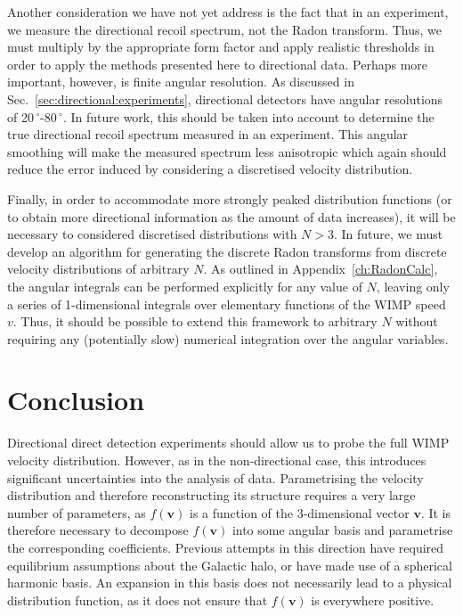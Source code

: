 Another consideration we have not yet address is the fact that in an experiment, we measure the directional recoil spectrum, not the Radon transform. Thus, we must multiply by the appropriate form factor and apply realistic thresholds in order to apply the methods presented here to directional data. Perhaps more important, however, is finite angular resolution. As discussed in Sec.~\ref{sec:directional:experiments}, directional detectors have angular resolutions of 20$\,^{\circ}$-80$\,^{\circ}$. In future work, this should be taken into account to determine the true directional recoil spectrum measured in an experiment. This angular smoothing will make the measured spectrum less anisotropic which again should reduce the error induced by considering a discretised velocity distribution.

Finally, in order to accommodate more strongly peaked distribution functions (or to obtain more directional information as the amount of data increases), it will be necessary to considered discretised distributions with $N > 3$. In future, we must develop an algorithm for generating the discrete Radon transforms from discrete velocity distributions of arbitrary $N$. As outlined in Appendix~\ref{ch:RadonCalc}, the angular integrals can be performed explicitly for any value of $N$, leaving only a series of 1-dimensional integrals over elementary functions of the WIMP speed $v$. Thus, it should be possible to extend this framework to arbitrary $N$ without requiring any (potentially slow) numerical integration over the angular variables.

\section{Conclusion}

Directional direct detection experiments should allow us to probe the full WIMP velocity distribution. However, as in the non-directional case, this introduces significant uncertainties into the analysis of data. Parametrising the velocity distribution and therefore reconstructing its structure requires a very large number of parameters, as $f(\mathbf{v})$ is a function of the 3-dimensional vector $\mathbf{v}$. It is therefore necessary to decompose $f(\mathbf{v})$ into some angular basis and parametrise the corresponding coefficients. Previous attempts in this direction have required equilibrium assumptions about the Galactic halo, or have made use of a spherical harmonic basis. An expansion in this basis does not necessarily lead to a physical distribution function, as it does not ensure that $f(\textbf{v})$ is everywhere positive.

